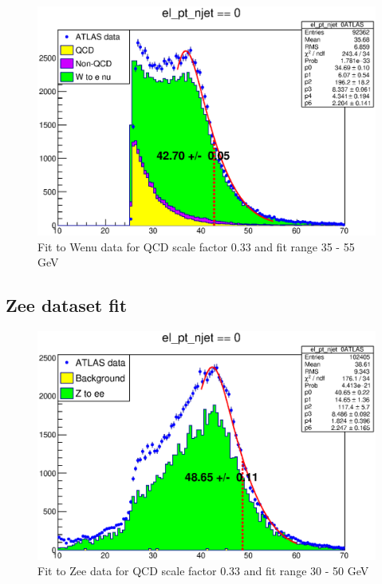 \begin{figure}
\centering
\includegraphics[width=\textwidth]{data/img/halfmax_Wenu_033_i_35_55.eps}
\caption{Fit to Wenu data for QCD scale factor 0.33 and fit range 35 - 55 GeV}
\end{figure}

\subsection{Zee dataset fit}
\begin{figure}
\centering
\includegraphics[width=\textwidth]{data/img/halfmax_Zee_033.eps}
\caption{Fit to Zee data for QCD scale factor 0.33 and fit range 30 - 50 GeV}
\end{figure}